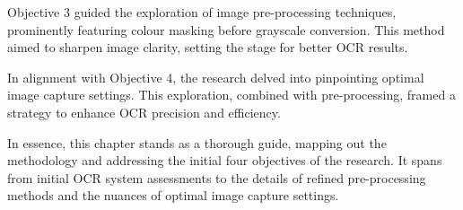 Objective 3 guided the exploration of image pre-processing techniques, prominently featuring colour masking before grayscale conversion. This method aimed to sharpen image clarity, setting the stage for better OCR results.

In alignment with Objective 4, the research delved into pinpointing optimal image capture settings. This exploration, combined with pre-processing, framed a strategy to enhance OCR precision and efficiency.

In essence, this chapter stands as a thorough guide, mapping out the methodology and addressing the initial four objectives of the research. It spans from initial OCR system assessments to the details of refined pre-processing methods and the nuances of optimal image capture settings.



